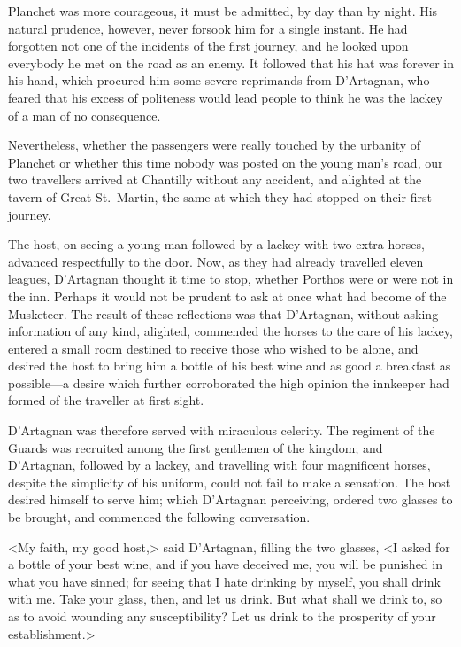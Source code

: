 Planchet was more courageous, it must be admitted, by day than by night. His natural prudence, however, never forsook him for a single instant. He had forgotten not one of the incidents of the first journey, and he looked upon everybody he met on the road as an enemy. It followed that his hat was forever in his hand, which procured him some severe reprimands from D'Artagnan, who feared that his excess of politeness would lead people to think he was the lackey of a man of no consequence. 

Nevertheless, whether the passengers were really touched by the urbanity of Planchet or whether this time nobody was posted on the young man's road, our two travellers arrived at Chantilly without any accident, and alighted at the tavern of Great St.~Martin, the same at which they had stopped on their first journey. 

The host, on seeing a young man followed by a lackey with two extra horses, advanced respectfully to the door. Now, as they had already travelled eleven leagues, D'Artagnan thought it time to stop, whether Porthos were or were not in the inn. Perhaps it would not be prudent to ask at once what had become of the Musketeer. The result of these reflections was that D'Artagnan, without asking information of any kind, alighted, commended the horses to the care of his lackey, entered a small room destined to receive those who wished to be alone, and desired the host to bring him a bottle of his best wine and as good a breakfast as possible—a desire which further corroborated the high opinion the innkeeper had formed of the traveller at first sight. 

D'Artagnan was therefore served with miraculous celerity. The regiment of the Guards was recruited among the first gentlemen of the kingdom; and D'Artagnan, followed by a lackey, and travelling with four magnificent horses, despite the simplicity of his uniform, could not fail to make a sensation. The host desired himself to serve him; which D'Artagnan perceiving, ordered two glasses to be brought, and commenced the following conversation. 

<My faith, my good host,> said D'Artagnan, filling the two glasses, <I asked for a bottle of your best wine, and if you have deceived me, you will be punished in what you have sinned; for seeing that I hate drinking by myself, you shall drink with me. Take your glass, then, and let us drink. But what shall we drink to, so as to avoid wounding any susceptibility? Let us drink to the prosperity of your establishment.> 

